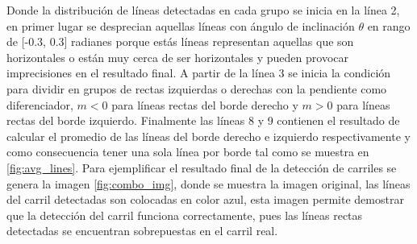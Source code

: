 Donde la distribución de líneas detectadas en cada grupo se inicia en la línea 2, en primer lugar se desprecian aquellas líneas con ángulo de inclinación $\theta$ en rango de [-0.3, 0.3] radianes porque estás líneas representan aquellas que son horizontales o están muy cerca de ser horizontales y pueden provocar imprecisiones en el resultado final. A partir de la línea 3 se inicia la condición para dividir en grupos de rectas izquierdas o derechas con la pendiente como diferenciador, $m < 0$ para líneas rectas del borde derecho y $m > 0$ para líneas rectas del borde izquierdo. Finalmente las líneas 8 y 9 contienen el resultado de calcular el promedio de las líneas del borde derecho e izquierdo respectivamente y como consecuencia tener una sola línea por borde tal como se muestra en \ref{fig:avg_lines}. Para ejemplificar el resultado final de la detección de carriles se genera la imagen \ref{fig:combo_img}, donde se muestra la imagen original, las líneas del carril detectadas son colocadas en color azul, esta imagen permite demostrar que la detección del carril funciona correctamente, pues las líneas rectas detectadas se encuentran sobrepuestas en el carril real.
